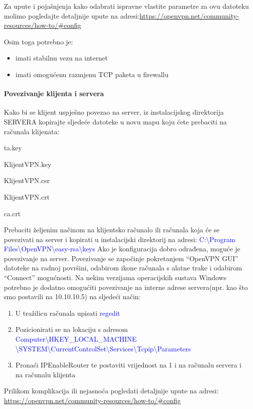 Za upute i pojašnjenja kako odabrati ispravne vlastite parametre za ovu datoteku molimo pogledajte detaljnije upute na adresi:\smallbreak \url{https://openvpn.net/community-resources/how-to/\#config}\smallbreak

Osim toga potrebno je:
\begin{itemize}
	\item imati stabilnu vezu na internet
	\item imati omogućenu razmjenu TCP paketa u firewallu
\end{itemize}	

\paragraph*{Povezivanje klijenta i servera}
\hfill \bigbreak
Kako bi se klijent uspješno povezao na server, iz instalacijskog direktorija SERVERA kopirajte sljedeće datoteke u novu mapu koju ćete prebaciti na računala klijenata:\smallbreak
{\small{}\selectfont
ta.key

KlijentVPN.key

KlijentVPN.csr

KlijentVPN.crt

ca.crt
}\smallbreak
Prebaciti željenim načinom na klijentsko računalo ili računala koja će se povezivati na server i kopirati u instalacijski direktorij na adresi:\smallbreak
\small\textcolor{blue}{C:\textbackslash Program Files\textbackslash OpenVPN\textbackslash easy-rsa\textbackslash keys}
\smallbreak
Ako je konfiguracija dobro odrađena, moguće je povezivanje na server. Povezivanje se započinje pokretanjem ``OpenVPN GUI'' datoteke na radnoj površini, odabirom ikone računala s alatne trake i odabirom ``Connect'' mogućnosti.
\bigbreak
Na nekim verzijama operacijskih sustava Windows potrebno je dodatno omogućiti povezivanje na interne adrese servera(npr. kao što smo postavili na 10.10.10.5) na sljedeći način:
\begin{enumerate}
  \item U tražilicu računala upisati \small\textcolor{blue}{regedit}
  \item Pozicionirati se na lokaciju s adresom \small\textcolor{blue}{Computer\textbackslash HKEY\_LOCAL\_MACHINE\newline
  \textbackslash SYSTEM\textbackslash CurrentControlSet\textbackslash Services\textbackslash Tcpip\textbackslash Parameters}
  \item Pronaći IPEnableRouter te postaviti vrijednost na 1 i na računalu servera i na računalu klijenta
\end{enumerate}
\bigbreak

Prilikom komplikacija ili nejasnoća pogledati detaljnije upute na adresi:\smallbreak
\url{https://openvpn.net/community-resources/how-to/\#config}
\smallbreak